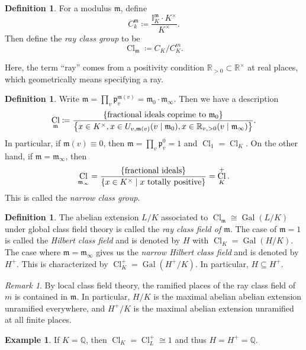 \documentclass[leqno, openany]{memoir}
\theoremstyle{definition}
\newtheorem{defn}[thm]{Definition}
\newtheorem{exm}[thm]{Example}
\theoremstyle{remark}
\newtheorem{rmk}[thm]{Remark}
\theoremstyle{plain}
\theoremstyle{definition}
\theoremstyle{remark}
\newcommand{\R}{\mathbb{R}}
\newcommand{\Q}{\mathbb{Q}}
\newcommand{\I}{\mathbb{I}}
\newcommand{\mf}[1]{\mathfrak{#1}}
\DeclareMathOperator{\Gal}{Gal}
\DeclareMathOperator{\Cl}{Cl}
\begin{document}
\begin{defn} For a modulus $\mf{m}$, define \[ C_k^{ \mf{m} } \coloneqq
    \frac{\I_K^{ \mf{m} } \cdot K^{\times}}{K^{\times}}. \] Then define the
    \textit{ray class group} to be \[ \Cl_{\mf{m}} \coloneqq C_K / C_K^m. \]
\end{defn}

Here, the term ``ray'' comes from a positivity condition $\R_{>0} \subset
\R^{\times}$ at real places, which geometrically means specifying a ray.

\begin{defn} Write $\mf{m} = \prod_v \mf{p}_v^{\mf{m}(v)} = \mf{m}_0 \cdot
    \mf{m}_{\infty}$. Then we have a description \[ \Cl_{\mf{m}} \coloneqq
    \frac{ \qty{\text{fractional ideals coprime to $\mf{m}_0$}} }{\qty{x \in
K^{\times}, x \in U_{v, \mf{m}(v)} (v \mid \mf{m}_0), x \in \R_{v,>0} (v \mid
\mf{m}_{\infty})}}. \] In particular, if $\mf{m}(v) \equiv 0$, then $\mf{m} =
\prod_v \mf{p}_v^0 = 1$ and $\Cl_1 = \Cl_K$. On the other hand, if $\mf{m} =
\mf{m}_{\infty}$, then \[ \Cl_{\mf{m}_{\infty}} = \frac{\qty{\text{fractional
ideals}}}{\qty{x \in K^{\times} \mid x\ \text{totally positive}}} = \Cl_K^+. \]
This is called the \textit{narrow class group}.  \end{defn}

\begin{defn} The abelian extension $L/K$ associated to $\Cl_{ \mf{m} } \cong
    \Gal(L/K)$ under global class field theory is called the \textit{ray class
    field of $\mf{m}$}. The case of $\mf{m}=1$ is called the \textit{Hilbert
class field} and is denoted by $H$ with $\Cl_K = \Gal(H/K)$. The case where
$\mf{m} = \mf{m}_{\infty}$ gives us the \textit{narrow Hilbert class field} and
is denoted by $H^+$. This is characterized by $\Cl_K^+ = \Gal(H^+/K)$. In
particular, $H \subseteq H^+$.  \end{defn}

\begin{rmk} By local class field theory, the ramified places of the ray class
    field of $m$ is contained in $\mf{m}$. In particular, $H/K$ is the maximal
    abelian abelian extension unramified everywhere, and $H^+/K$ is the maximal
    abelian extension unramified at all finite places.  \end{rmk}

\begin{exm} If $K = \Q$, then $\Cl_K = \Cl_L^+ \cong \qty{1}$ and thus $H = H^+
= \Q$.  \end{exm}
\end{document}
